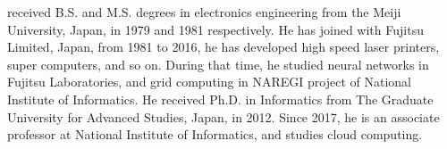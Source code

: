 {received B.S. and M.S. degrees in electronics engineering from the Meiji University, Japan, in 1979 and 1981 respectively. He has joined with Fujitsu Limited, Japan, from 1981 to 2016, he has developed high speed laser printers, super computers, and so on. During that time, he  studied neural networks in Fujitsu Laboratories, and grid computing in NAREGI project of National Institute of Informatics. He received Ph.D. in Informatics from The Graduate University for Advanced Studies, Japan, in 2012. Since 2017, he is an associate professor at National Institute of Informatics, and studies cloud computing.}
